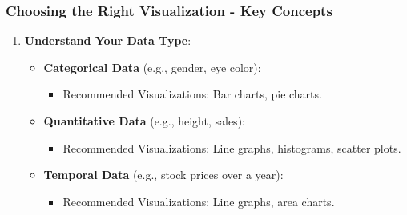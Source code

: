 \documentclass[aspectratio=169]{beamer}
\begin{document}
\begin{frame}[fragile]
    \frametitle{Choosing the Right Visualization - Key Concepts}
    \begin{enumerate}
        \item \textbf{Understand Your Data Type}:
            \begin{itemize}
                \item \textbf{Categorical Data} (e.g., gender, eye color):
                    \begin{itemize}
                        \item Recommended Visualizations: Bar charts, pie charts.
                    \end{itemize}
                \item \textbf{Quantitative Data} (e.g., height, sales):
                    \begin{itemize}
                        \item Recommended Visualizations: Line graphs, histograms, scatter plots.
                    \end{itemize}
                \item \textbf{Temporal Data} (e.g., stock prices over a year):
                    \begin{itemize}
                        \item Recommended Visualizations: Line graphs, area charts.
                    \end{itemize}
            \end{itemize}
        

\end{enumerate}
\end{frame}
\end{document}
